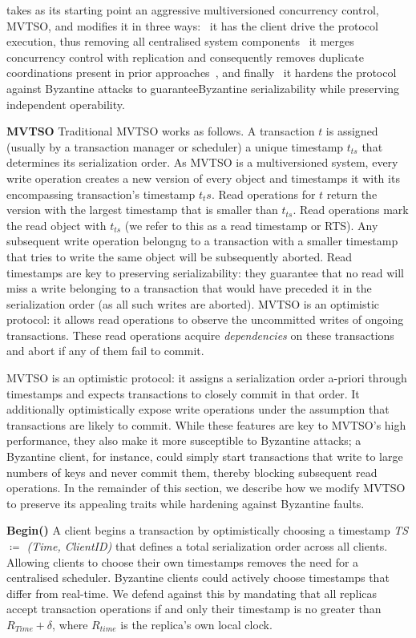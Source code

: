 \sys{} takes as its starting point an aggressive multiversioned concurrency control,
MVTSO, and modifies it in three ways: \one~it has the client drive the protocol execution,
thus removing all centralised system components \two~it merges concurrency control
with replication and consequently removes duplicate coordinations present in prior approaches~\cite{}, and finally \three~it hardens the protocol against Byzantine attacks to guaranteeByzantine serializability while preserving independent operability.

\par \textbf{MVTSO} Traditional MVTSO works as follows. A transaction $t$ is assigned (usually by a transaction manager or scheduler) a unique timestamp $t_{ts}$ that determines its serialization order. As MVTSO is a multiversioned system, every write operation creates a new version of every object and timestamps it with its encompassing transaction's timestamp $t_ts$. Read operations for $t$ return the version with the largest timestamp that is smaller than $t_{ts}$. Read operations mark the read object with $t_{ts}$ (we refer to this as a read timestamp or RTS). Any subsequent write operation belongng to a transaction with a smaller timestamp that tries to write the same object will be subsequently aborted. Read timestamps are key to preserving serializability: they guarantee that no read will miss a write belonging to a transaction that would have preceded it in the serialization order (as all such writes are aborted). MVTSO is an optimistic protocol: it allows read operations to observe the uncommitted writes of ongoing transactions. These read operations acquire \textit{dependencies} on these transactions and abort if any of them fail to commit.   

MVTSO is an optimistic protocol: it assigns a serialization order a-priori through timestamps and expects transactions to closely commit in that order. It additionally optimistically expose write operations under the assumption that transactions are likely to commit. While these features are key to MVTSO's high performance, they also make it more susceptible to Byzantine attacks; a Byzantine client, for instance, could simply start transactions that write to large numbers of keys and never
commit them, thereby blocking subsequent read operations. In the remainder of this section, we describe how we modify MVTSO to preserve its appealing traits while hardening against Byzantine faults.

\par \textbf{Begin()} A client begins a transaction by optimistically choosing a timestamp \textit{TS $\coloneqq$ (Time, ClientID)} that defines a total serialization order across all clients. Allowing clients to choose their own timestamps removes the need for a centralised scheduler. Byzantine clients could actively choose timestamps that differ from real-time. We defend against this by mandating that all replicas accept transaction operations if and only their timestamp is no greater than
$R_{Time} + \delta$, where $R_{time}$ is the replica's own local clock.


